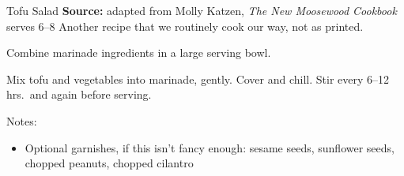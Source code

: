 \begin{recipe}[]{Tofu Salad}{}%
 {\textbf{Source:} adapted from Molly Katzen, \textit{The New Moosewood Cookbook} \hfill serves 6--8}
 \freeform Another recipe that we routinely cook our way, not as printed.

 Combine marinade ingredients in a large serving bowl.

 Mix tofu and vegetables into marinade, gently. Cover and chill. Stir every 6--12 hrs.\ and again before serving.

 \freeform Notes:
 \begin{itemize}
  \item Optional garnishes, if this isn't fancy enough: sesame seeds, sunflower seeds, chopped peanuts, chopped cilantro
 \end{itemize}

\end{recipe}
